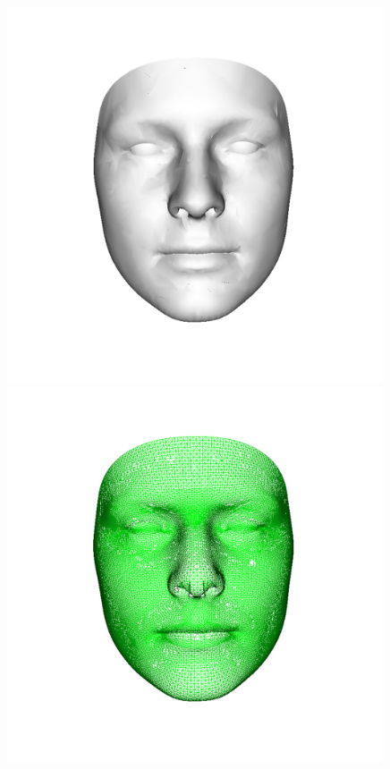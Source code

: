 \begin{figure}[h]
\begin{minipage}{.325\textwidth}
  \end{minipage}
  \begin{minipage}{.325\textwidth}
    \centering
    \includegraphics[width=0.99\textwidth]{Figures/Pictures/d09a_t.png}
  \end{minipage}
  \begin{minipage}{.325\textwidth}
    \centering
    \includegraphics[width=0.99\textwidth]{Figures/Pictures/d01_t.png}

\end{minipage}
\end{figure}
